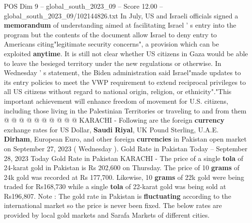 \begin{textsample}{POS Dim 9 – global\_south\_2023\_09 – Score 12.00 – global\_south\_2023\_09/102144826.txt}
In July, US and Israeli officials signed a \textbf{memorandum} of understanding aimed at facilitating Israel ' s entry into the program but the contents of the document allow Israel to deny entry to Americans citing"legitimate security concerns", a provision which can be exploited \textbf{anytime}.
It is still not clear whether US citizens in Gaza would be able to leave the besieged territory under the new regulations or otherwise.
In Wednesday ' s statement, the Biden administration said Israel"made updates to its entry policies to meet the VWP requirement to extend reciprocal privileges to all US citizens without regard to national origin, religion, or ethnicity"."This important achievement will enhance freedom of movement for U.S. citizens, including those living in the Palestinian Territories or traveling to and from them @ @ @ @ @ @ @ @ @ @ KARACHI - Following are the foreign \textbf{currency} exchange rates for US Dollar, \textbf{Saudi} \textbf{Riyal}, UK Pound Sterling, U.A.E. \textbf{Dirham}, European Euro, and other foreign \textbf{currencies} in Pakistan open market on September 27, 2023 ( Wednesday ).
Gold Rate in Pakistan Today -- September 28, 2023 Today Gold Rate in Pakistan KARACHI - The price of a single \textbf{tola} of 24-karat gold in Pakistan is Rs 202,600 on Thursday.
The price of 10 \textbf{grams} of 24k gold was recorded at Rs 177,700.
Likewise, 10 \textbf{grams} of 22k gold were being traded for Rs168,730 while a single \textbf{tola} of 22-karat gold was being sold at Rs196,807.
Note : The gold rate in Pakistan is \textbf{fluctuating} according to the international market so the price is never been fixed.
The below rates are provided by local gold markets and Sarafa Markets of different cities.

\end{textsample}
